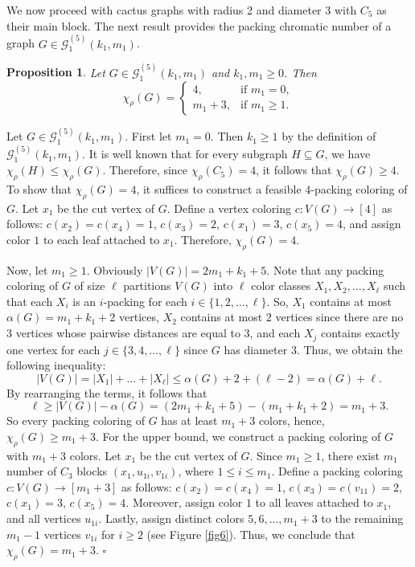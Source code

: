\documentclass[12pt]{article}
\newtheorem{proposition}[theorem]{Proposition}
\newcommand{\proof}{\noindent{\bf Proof.\ }}
\newcommand{\qed}{\hfill $\square$ \bigskip}
\begin{document}
We now proceed with cactus graphs with radius 2 and diameter $3$ with $C_5$ as their main block. The next result provides the packing chromatic number of a graph $G \in \mathcal{G}_{1}^{(5)}(k_1,m_1)$.

\begin{proposition}\label{pro4} 
Let $G \in \mathcal{G}_{1}^{(5)}(k_1,m_1)$ and $k_1, m_1 \geq 0$. Then
\[
\chi_\rho(G) =
\begin{cases}
4, & \text{if } m_1 = 0, \\[6pt]
m_1+3, & \text{if } m_1 \geq 1.
\end{cases}
\]
\end{proposition}

\proof Let $G \in \mathcal{G}_{1}^{(5)}(k_1,m_1)$. First let $m_1 = 0$. Then $k_1 \geq 1$ by the definition of $\mathcal{G}_{1}^{(5)}(k_1,m_1)$.  It is well known that for every subgraph \( H \subseteq G \), we have \( \chi_\rho(H) \leq \chi_\rho(G) \). Therefore, since \( \chi_\rho(C_5) = 4 \), it follows that \( \chi_\rho(G) \geq 4 \). To show that \( \chi_\rho(G) = 4 \), it suffices to construct a feasible $4$-packing coloring of \( G \). Let $x_1$ be the cut vertex of $G$. Define a vertex coloring $c:V(G)\to[4]$ as follows: $c(x_2) = c(x_4)=1$, $c(x_3)=2$, $c(x_1) = 3$, $c(x_5) = 4$, and assign color $1$ to each leaf attached to $x_1$. Therefore,  $\chi_\rho(G) =  4$. 
	
Now, let \( m_1 \geq 1 \). Obviously $|V(G)|=2m_1+k_1+5$. Note that any packing coloring of $G$ of size $\ell$ partitions $V(G)$ into $\ell$ color classes $X_1, X_2, \dots,X_{\ell}$ such that each $X_i$ is an $i$-packing for each $i \in \{1, 2, \dots, \ell\}$. So, $X_1$ contains at most $\alpha(G)=m_1+k_1+2$ vertices, $X_2$ contains at most $2$ vertices since there are no $3$ vertices whose pairwise distances are equal to $3$, and each $X_j$ contains exactly one vertex for each $j \in \{3, 4, \dots, \ell\}$ since $G$ has diameter $3$. Thus, we obtain the following inequality:
$$
|V(G)|=|X_1| + \dots + |X_{\ell}| \leq \alpha(G) + 2 + (\ell - 2) = \alpha(G) + \ell.
$$
By rearranging the terms, it follows that
\[
\ell \geq |V(G)| - \alpha(G)
= (2m_1+k_1+5) - (m_1+k_1+2)
= m_1+3.
\]
So every packing coloring of $G$ has at least $m_1 + 3$ colors,
hence, $\chi_{\rho}(G) \geq m_1 + 3.$
For the upper bound, we construct a packing coloring of $G$ with $m_1+3$ colors.  
Let $x_1$ be the cut vertex of $G$. Since $m_1 \geq 1$, there exist $m_1$ number of $C_3$ blocks $(x_1,u_{1i},v_{1i})$, where $1 \leq i \leq m_1$. Define a packing coloring $c:V(G)\to[m_1+3]$ as follows: $c(x_2) = c(x_4)=1$, $c(x_3)=c(v_{11})=2$, $c(x_1) = 3$, $c(x_5) = 4$.
Moreover, assign color $1$ to all leaves attached to $x_1$, and all vertices $u_{1i}$.
Lastly, assign distinct colors $5,6,\dots,m_1+3$ to the remaining $m_1-1$ vertices $v_{1i}$ for $i\geq 2$ (see Figure \ref{fig6}). Thus, we conclude that  $\chi_\rho(G) =  m_1+3$.
\qed
\end{document}
